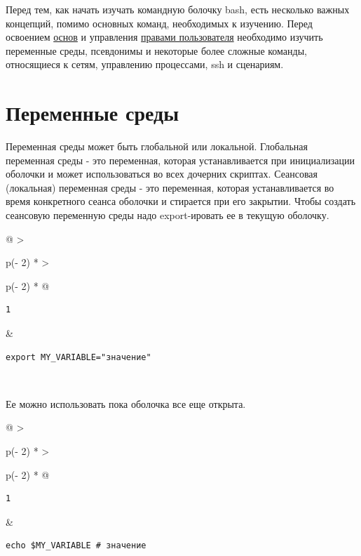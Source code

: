 \documentclass{article}
\begin{document}
Перед тем, как начать изучать командную болочку bash, есть несколько
важных концепций, помимо основных команд, необходимых к изучению. Перед
освоением \href{}{основ} и управления
\href{blog/2019/user-permissions/}{правами пользователя} необходимо
изучить переменные среды, псевдонимы и некоторые более сложные команды,
относящиеся к сетям, управлению процессами, ssh и сценариям.

\hypertarget{Environment-variables}{%
\section{\texorpdfstring{\protect\hyperlink{Environment-variables}{}Переменные
среды}{Переменные среды}}\label{Environment-variables}}

\hypertarget{player}{}

Переменная среды может быть глобальной или локальной. Глобальная
переменная среды - это переменная, которая устанавливается при
инициализации оболочки и может использоваться во всех дочерних скриптах.
Сеансовая (локальная) переменная среды - это переменная, которая
устанавливается во время конкретного сеанса оболочки и стирается при его
закрытии. Чтобы создать сеансовую переменную среды надо export-ировать
ее в текущую оболочку.

\begin{longtable}[]{@{}
  >{\raggedright\arraybackslash}p{(\columnwidth - 2\tabcolsep) * }
  >{\raggedright\arraybackslash}p{(\columnwidth - 2\tabcolsep) * }@{}}
\toprule
\endhead
\begin{minipage}[t]{\linewidth}\raggedright
\begin{verbatim}
1
\end{verbatim}
\end{minipage} & \begin{minipage}[t]{\linewidth}\raggedright
\begin{verbatim}
export MY_VARIABLE="значение"
\end{verbatim}
\end{minipage} \\ \addlinespace
\bottomrule
\end{longtable}

Ее можно использовать пока оболочка все еще открыта.

\begin{longtable}[]{@{}
  >{\raggedright\arraybackslash}p{(\columnwidth - 2\tabcolsep) * }
  >{\raggedright\arraybackslash}p{(\columnwidth - 2\tabcolsep) * }@{}}
\toprule
\endhead
\begin{minipage}[t]{\linewidth}\raggedright
\begin{verbatim}
1
\end{verbatim}
\end{minipage} & \begin{minipage}[t]{\linewidth}\raggedright
\begin{verbatim}
echo $MY_VARIABLE # значение
\end{verbatim}
\end{minipage} \\ \addlinespace
\bottomrule
\end{longtable}
\end{document}
